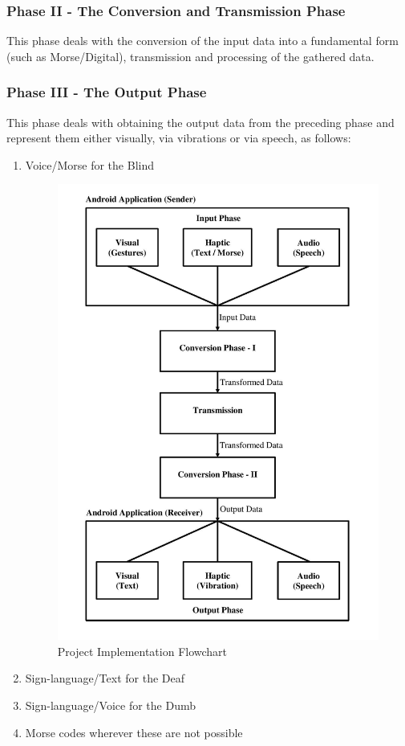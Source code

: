 \documentclass[14pt]{report}
\begin{document}
			\subsubsection{Phase II - The Conversion and Transmission Phase}
				This phase deals with the conversion of the input data into a fundamental form (such as Morse/Digital), transmission and processing of the gathered data.
			\subsubsection{Phase III - The Output Phase}
				This phase deals with obtaining the output data from the preceding phase and represent them either visually, via vibrations or via speech, as follows:
				\begin{enumerate}
					\item Voice/Morse for the Blind
					\begin{figure}[H]
						\includegraphics[width=\textwidth]{ProjectFlow.jpg}
						\centering
						\caption{Project Implementation Flowchart}
						\label{fig:ProjectFlow}
					\end{figure}
					\item Sign-language/Text for the Deaf
					\item Sign-language/Voice for the Dumb
					\item Morse codes wherever these are not possible
				\end{enumerate}
			
\end{document}

